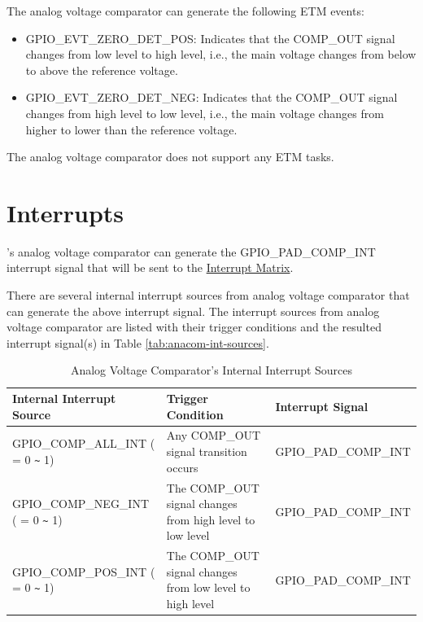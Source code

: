 \documentclass[main\_\_EN.tex]{subfiles}
\begin{document}
The analog voltage comparator can generate the following ETM events:

\begin{itemize}
    \item GPIO\_EVT\_ZERO\_DET\_POS: Indicates that the COMP\_OUT signal changes from low level to high level, i.e., the main voltage changes from below to above the reference voltage.
    \item GPIO\_EVT\_ZERO\_DET\_NEG: Indicates that the COMP\_OUT signal changes from high level to low level, i.e., the main voltage changes from higher to lower than the reference voltage.
\end{itemize}

The analog voltage comparator does not support any ETM tasks.



\section{Interrupts}

\chipname{}'s analog voltage comparator can generate the GPIO\_PAD\_COMP\_INT interrupt signal that will be sent to the \hyperref[mod:intmtrx]{Interrupt Matrix}.

There are several internal interrupt sources from analog voltage comparator that can generate the above interrupt signal. The interrupt sources from analog voltage comparator are listed with their trigger conditions and the resulted interrupt signal(s) in Table \ref{tab:anacom-int-sources}.

\begin{longtable}{ | L{5.5cm} | L{6cm} | L{4cm} | }
\caption{Analog Voltage Comparator's Internal Interrupt Sources} \label{tab:anacom-int-sources}
\\ \hline
{}
\textbf{Internal Interrupt Source} & \textbf{Trigger Condition}  &  \textbf{Interrupt Signal}\\ \hline
\label{int:GPIOCOMPnALLINT}GPIO\_COMP\_ALL\_INT ( = 0 \verb+~+ 1) & Any COMP\_OUT signal transition occurs &  GPIO\_PAD\_COMP\_INT  \\ \hline
\label{int:GPIOCOMPnNEGINT}GPIO\_COMP\_NEG\_INT ( = 0 \verb+~+ 1) & The COMP\_OUT signal changes from high level to low level  & GPIO\_PAD\_COMP\_INT \\ \hline
\label{int:GPIOCOMPnPOSINT}GPIO\_COMP\_POS\_INT ( = 0 \verb+~+ 1) &  The COMP\_OUT signal changes from low level to high level & GPIO\_PAD\_COMP\_INT \\ \hline
\end{longtable}
\end{document}
